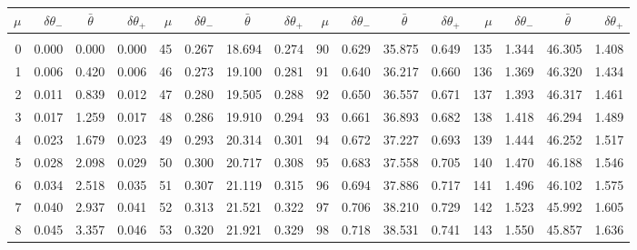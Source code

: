\newpage
\begin{table}\centering
\small{ \begin{tabular}{rrrr|rrrr|rrrr|rrrr}
$\mu$ & $\delta\theta_-$  & $\bar{\theta}~~~~$ & $\delta\theta_+$ &
$\mu$ & $\delta\theta_-$  & $\bar{\theta}~~~~$ & $\delta\theta_+$ &
$\mu$ & $\delta\theta_-$  & $\bar{\theta}~~~~$ & $\delta\theta_+$ &
$\mu$ & $\delta\theta_-$  & $\bar{\theta}~~~~$ & $\delta\theta_+$ \\\hline
&&&&&&&&&&&&&&&\\[-1.75ex]
  0 & \tiny{  0.000} &   0.000 & \tiny{  0.000} &  45 & \tiny{  0.267} &  18.694 & \tiny{  0.274} &  90 & \tiny{  0.629} &  35.875 & \tiny{  0.649} & 135 & \tiny{  1.344} &  46.305 & \tiny{  1.408}\\
  1 & \tiny{  0.006} &   0.420 & \tiny{  0.006} &  46 & \tiny{  0.273} &  19.100 & \tiny{  0.281} &  91 & \tiny{  0.640} &  36.217 & \tiny{  0.660} & 136 & \tiny{  1.369} &  46.320 & \tiny{  1.434}\\
  2 & \tiny{  0.011} &   0.839 & \tiny{  0.012} &  47 & \tiny{  0.280} &  19.505 & \tiny{  0.288} &  92 & \tiny{  0.650} &  36.557 & \tiny{  0.671} & 137 & \tiny{  1.393} &  46.317 & \tiny{  1.461}\\
  3 & \tiny{  0.017} &   1.259 & \tiny{  0.017} &  48 & \tiny{  0.286} &  19.910 & \tiny{  0.294} &  93 & \tiny{  0.661} &  36.893 & \tiny{  0.682} & 138 & \tiny{  1.418} &  46.294 & \tiny{  1.489}\\
  4 & \tiny{  0.023} &   1.679 & \tiny{  0.023} &  49 & \tiny{  0.293} &  20.314 & \tiny{  0.301} &  94 & \tiny{  0.672} &  37.227 & \tiny{  0.693} & 139 & \tiny{  1.444} &  46.252 & \tiny{  1.517}\\
  5 & \tiny{  0.028} &   2.098 & \tiny{  0.029} &  50 & \tiny{  0.300} &  20.717 & \tiny{  0.308} &  95 & \tiny{  0.683} &  37.558 & \tiny{  0.705} & 140 & \tiny{  1.470} &  46.188 & \tiny{  1.546}\\
  6 & \tiny{  0.034} &   2.518 & \tiny{  0.035} &  51 & \tiny{  0.307} &  21.119 & \tiny{  0.315} &  96 & \tiny{  0.694} &  37.886 & \tiny{  0.717} & 141 & \tiny{  1.496} &  46.102 & \tiny{  1.575}\\
  7 & \tiny{  0.040} &   2.937 & \tiny{  0.041} &  52 & \tiny{  0.313} &  21.521 & \tiny{  0.322} &  97 & \tiny{  0.706} &  38.210 & \tiny{  0.729} & 142 & \tiny{  1.523} &  45.992 & \tiny{  1.605}\\
  8 & \tiny{  0.045} &   3.357 & \tiny{  0.046} &  53 & \tiny{  0.320} &  21.921 & \tiny{  0.329} &  98 & \tiny{  0.718} &  38.531 & \tiny{  0.741} & 143 & \tiny{  1.550} &  45.857 & \tiny{  1.636}\\

\end{tabular}}
\end{table}
